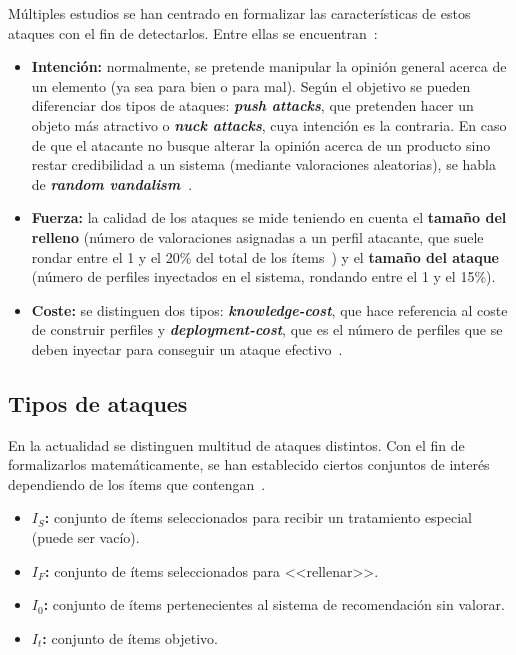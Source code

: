 Múltiples estudios se han centrado en formalizar las características de estos ataques con el fin de detectarlos. Entre ellas se encuentran~\cite{mingdan2018ShillingAttacksAReview}:

\begin{itemize}
	
	\item \textbf{Intención:} normalmente, se pretende manipular la opinión general acerca de un elemento (ya sea para bien o para mal). Según el objetivo se pueden diferenciar dos tipos de ataques: \textbf{\textit{push attacks}}, que pretenden hacer un objeto más atractivo o \textbf{\textit{nuck attacks}}, cuya intención es la contraria. En caso de que el atacante no busque alterar la opinión acerca de un producto sino restar credibilidad a un sistema (mediante valoraciones aleatorias), se habla de \textbf{\textit{random vandalism}~\cite{Burke2015RobustCollaborative}}.
	
	\item \textbf{Fuerza:} la calidad de los ataques se mide teniendo en cuenta el \textbf{tamaño del relleno} (número de valoraciones asignadas a un perfil atacante, que suele rondar entre el 1 y el 20\% del total de los ítems~\cite{mingdan2018ShillingAttacksAReview}) y el \textbf{tamaño del ataque} (número de perfiles inyectados en el sistema, rondando entre el 1 y el 15\%).
	
	\item \textbf{Coste:} se distinguen dos tipos: \textbf{\textit{knowledge-cost}}, que hace referencia al coste de construir perfiles y \textbf{\textit{deployment-cost}}, que es el número de perfiles que se deben inyectar para conseguir un ataque efectivo~\cite{Mobasher2006Thesis}.
	
\end{itemize}
		
\subsection{Tipos de ataques}

En la actualidad se distinguen multitud de ataques distintos. Con el fin de formalizarlos matemáticamente, se han establecido ciertos conjuntos de interés dependiendo de los ítems que contengan~\cite{zhou2021SemisupervisedRecommendationAttack}.

\begin{itemize}
	
	\item \textbf{$I_S$:} conjunto de ítems seleccionados para recibir un tratamiento especial (puede ser vacío).
	\item \textbf{$I_F$:} conjunto de ítems seleccionados para <<rellenar>>.
	\item \textbf{$I_0$:} conjunto de ítems pertenecientes al sistema de recomendación sin valorar.
	\item \textbf{$I_t$:} conjunto de ítems objetivo.
	
\end{itemize}


